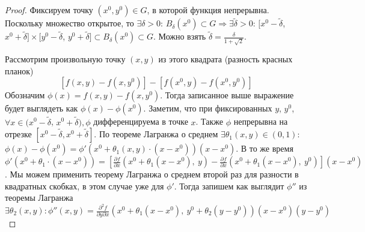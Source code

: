 \begin{proof}
    Фиксируем точку $(x^0, y^0) \in G$, в которой функция непрерывна. Поскольку множество открытое, то $\exists \delta > 0$: $B_\delta(x^0) \subset G \Rightarrow \exists \widetilde{\delta} > 0$: $[x^0 - \widetilde{\delta}$, $x^0 + \widetilde{\delta }] \times [y^0 - \widetilde{\delta}$, $y^0 + \widetilde{\delta}] \subset B_{\delta}(x^0) \subset G$. Можно взять $\widetilde{\delta} = \frac{\delta}{1 + \sqrt{2}}$.
    \begin{center}
    \end{center}

    \noindent Рассмотрим произвольную точку $(x, y)$ из этого квадрата (разность красных планок)
    $$\left[f(x, y) - f(x, y^0)\right] - \left[f(x^0, y) - f(x^0, y^0)\right]$$ Обозначим $\phi(x) = f(x, y) - f(x, y^0)$. Тогда записанное выше выражение будет выглядеть как $\phi(x) - \phi(x^0)$. Заметим, что при фиксированных $y$, $y^0$, $\forall x \in (x^0 - \widetilde{\delta}$, $x^0 + \widetilde{\delta}), \phi$ дифференцируема в точке $x$. Также $\phi$ непрерывна на отрезке $[x^0 - \widetilde{\delta}, x^0 + \widetilde{\delta}]$. 
    \noindent По теореме Лагранжа о среднем $\exists \theta_1(x, y) \in (0, 1)$: $\phi(x) - \phi(x^0) = \phi'(x^0 + \theta_1(x, y) \cdot (x - x^0))(x - x^0)$. В то же время $ \phi'(x^0 + \theta_1 \cdot (x - x^0)) = \left[\frac{\partial f}{\partial x}(x^0 + \theta_1(x - x^0), \ y) - \frac{\partial f}{\partial x}(x^0 + \theta_1(x - x^0), \ y^0)\right](x - x^0)$. Мы можем применить теорему Лагранжа о среднем второй раз для разности в квадратных скобках, в этом случае уже для $\phi'$. Тогда запишем как выглядит $\phi''$ из теоремы Лагранжа $\exists \theta_2(x, y): \phi''(x, y) 
    = \frac{\partial^2 f}{\partial y \partial x}(x^0 + \theta_1(x - x^0), \ y^0 + \theta_2(y - y^0))(x - x^0)(y - y^0)$


\end{proof}
